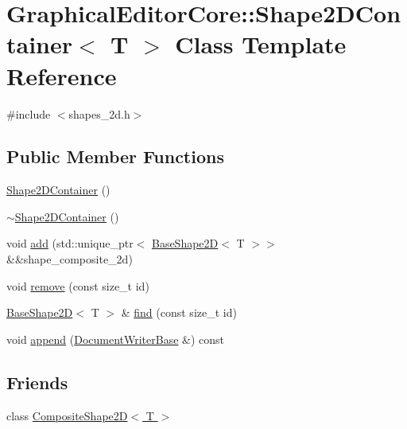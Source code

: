 \hypertarget{classGraphicalEditorCore_1_1Shape2DContainer}{}\section{Graphical\+Editor\+Core\+:\+:Shape2\+D\+Container$<$ T $>$ Class Template Reference}
\label{classGraphicalEditorCore_1_1Shape2DContainer}


{\ttfamily \#include $<$shapes\+\_\+2d.\+h$>$}

\subsection*{Public Member Functions}
\begin{DoxyCompactItemize}
\item 
\hyperlink{classGraphicalEditorCore_1_1Shape2DContainer_a07a8d036141605e8119aa861d92b621c}{Shape2\+D\+Container} ()
\item 
\hyperlink{classGraphicalEditorCore_1_1Shape2DContainer_a73f2c173b8eaadd296591251d95abdb2}{$\sim$\+Shape2\+D\+Container} ()
\item 
void \hyperlink{classGraphicalEditorCore_1_1Shape2DContainer_a319eaa4224faae3a76720132d9bc7c22}{add} (std\+::unique\+\_\+ptr$<$ \hyperlink{classGraphicalEditorCore_1_1BaseShape2D}{Base\+Shape2D}$<$ T $>$$>$ \&\&shape\+\_\+composite\+\_\+2d)
\item 
void \hyperlink{classGraphicalEditorCore_1_1Shape2DContainer_aaba57542cb133dfbe71c4e0857cccbc2}{remove} (const size\+\_\+t id)
\item 
\hyperlink{classGraphicalEditorCore_1_1BaseShape2D}{Base\+Shape2D}$<$ T $>$ \& \hyperlink{classGraphicalEditorCore_1_1Shape2DContainer_a855ae4eb2ca27b643c24cc5eea414711}{find} (const size\+\_\+t id)
\item 
void \hyperlink{classGraphicalEditorCore_1_1Shape2DContainer_af3a704d3db3d75a0c4b83733c05cf211}{append} (\hyperlink{classGraphicalEditorCore_1_1DocumentWriterBase}{Document\+Writer\+Base} \&) const 
\end{DoxyCompactItemize}
\subsection*{Friends}
\begin{DoxyCompactItemize}
\item 
class \hyperlink{classGraphicalEditorCore_1_1Shape2DContainer_ad3ba7f8293bd2db1bdd18a1f4b2f2eb8}{Composite\+Shape2\+D$<$ T $>$}
\end{DoxyCompactItemize}


